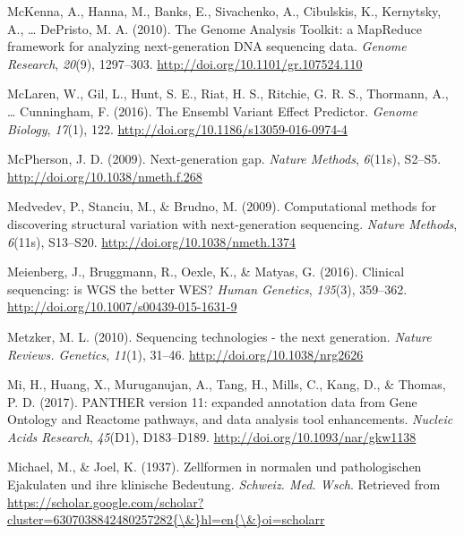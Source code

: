 \documentclass[12pt,twoside]{reedthesis}
\theoremstyle{definition}
\theoremstyle{definition}
\theoremstyle{remark}
\begin{document}
  \hypertarget{ref-McKenna2010}{}
  McKenna, A., Hanna, M., Banks, E., Sivachenko, A., Cibulskis, K.,
  Kernytsky, A., \ldots{} DePristo, M. A. (2010). The Genome Analysis
  Toolkit: a MapReduce framework for analyzing next-generation DNA
  sequencing data. \emph{Genome Research}, \emph{20}(9), 1297--303.
  \url{http://doi.org/10.1101/gr.107524.110}
  
  \hypertarget{ref-McLaren2016}{}
  McLaren, W., Gil, L., Hunt, S. E., Riat, H. S., Ritchie, G. R. S.,
  Thormann, A., \ldots{} Cunningham, F. (2016). The Ensembl Variant Effect
  Predictor. \emph{Genome Biology}, \emph{17}(1), 122.
  \url{http://doi.org/10.1186/s13059-016-0974-4}
  
  \hypertarget{ref-McPherson2009}{}
  McPherson, J. D. (2009). Next-generation gap. \emph{Nature Methods},
  \emph{6}(11s), S2--S5. \url{http://doi.org/10.1038/nmeth.f.268}
  
  \hypertarget{ref-Medvedev2009}{}
  Medvedev, P., Stanciu, M., \& Brudno, M. (2009). Computational methods
  for discovering structural variation with next-generation sequencing.
  \emph{Nature Methods}, \emph{6}(11s), S13--S20.
  \url{http://doi.org/10.1038/nmeth.1374}
  
  \hypertarget{ref-Meienberg2016}{}
  Meienberg, J., Bruggmann, R., Oexle, K., \& Matyas, G. (2016). Clinical
  sequencing: is WGS the better WES? \emph{Human Genetics}, \emph{135}(3),
  359--362. \url{http://doi.org/10.1007/s00439-015-1631-9}
  
  \hypertarget{ref-Metzker2010}{}
  Metzker, M. L. (2010). Sequencing technologies - the next generation.
  \emph{Nature Reviews. Genetics}, \emph{11}(1), 31--46.
  \url{http://doi.org/10.1038/nrg2626}
  
  \hypertarget{ref-Mi2017}{}
  Mi, H., Huang, X., Muruganujan, A., Tang, H., Mills, C., Kang, D., \&
  Thomas, P. D. (2017). PANTHER version 11: expanded annotation data from
  Gene Ontology and Reactome pathways, and data analysis tool
  enhancements. \emph{Nucleic Acids Research}, \emph{45}(D1), D183--D189.
  \url{http://doi.org/10.1093/nar/gkw1138}
  
  \hypertarget{ref-Michael1937}{}
  Michael, M., \& Joel, K. (1937). Zellformen in normalen und
  pathologischen Ejakulaten und ihre klinische Bedeutung. \emph{Schweiz.
  Med. Wsch}. Retrieved from
  \href{https://scholar.google.com/scholar?cluster=6307038842480257282\%7B/\&\%7Dhl=en\%7B/\&\%7Doi=scholarr}{https://scholar.google.com/scholar?cluster=6307038842480257282\{\textbackslash{}\&\}hl=en\{\textbackslash{}\&\}oi=scholarr}
  
\end{document}
